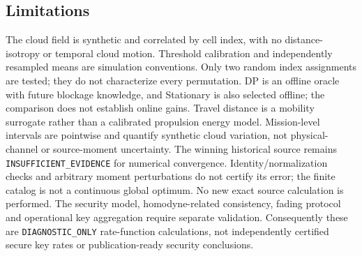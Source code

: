\subsection{Limitations}
The cloud field is synthetic and correlated by cell index, with no
distance-isotropy or temporal cloud motion. Threshold calibration and
independently resampled means are simulation conventions. Only two random
index assignments are tested; they do not characterize every permutation.
DP is an offline oracle with future blockage knowledge, and Stationary
is also selected offline; the comparison does not establish online gains.
Travel distance is a mobility surrogate rather than a calibrated propulsion
energy model. Mission-level intervals are pointwise and quantify synthetic
cloud variation, not physical-channel or source-moment uncertainty.
The winning historical source remains \texttt{INSUFFICIENT\_EVIDENCE} for
numerical convergence. Identity/normalization checks and arbitrary moment
perturbations do not certify its error; the finite catalog is not a continuous
global optimum. No new exact source calculation is performed. The security
model, homodyne-related consistency, fading protocol and operational key
aggregation require separate validation. Consequently these are
\texttt{DIAGNOSTIC\_ONLY} rate-function calculations, not independently
certified secure key rates or publication-ready security conclusions.
